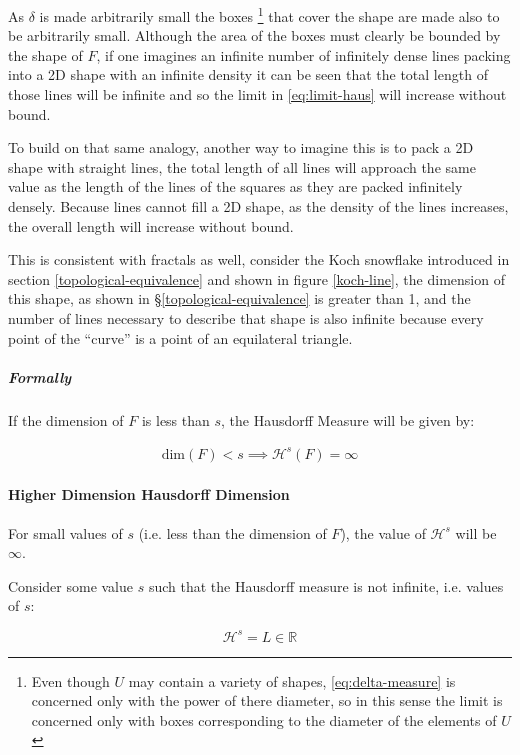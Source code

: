 \documentclass[a4paper,11pt,twoside]{article}
\begin{document}
As \(\delta\) is made arbitrarily small the boxes \footnote{Even though \(U\) may contain a variety of shapes, \eqref{eq:delta-measure} is concerned only with the power of there diameter, so in this sense the limit is concerned only with boxes corresponding to the diameter of the elements of \(U\)} that cover the shape are made also to be arbitrarily small. Although the area of the boxes must clearly be bounded by the shape of \(F\), if one imagines an infinite number of infinitely dense lines packing into a 2D shape with an infinite density it can be seen that the total length of those lines will be infinite and so the limit in \eqref{eq:limit-haus} will increase without bound.

To build on that same analogy, another way to imagine this is to pack a 2D shape with straight lines, the total length of all lines will approach the same value as the length of the lines of the squares as they are packed infinitely densely. Because lines cannot fill a 2D shape, as the density of the lines increases, the overall length will increase without bound.

This is consistent with fractals as well, consider the Koch snowflake introduced in section \ref{topological-equivalence} and shown in figure \ref{koch-line}, the dimension of this shape, as shown in \S \ref{topological-equivalence} is greater than 1, and the number of lines necessary to describe that shape is also infinite because every point of the ``curve'' is a point of an equilateral triangle.

\subparagraph{Formally}
\label{sec:org2193f0b}
If the dimension of \(F\) is less than \(s\), the Hausdorff Measure will be given by:

\begin{align}
\mathrm{dim}\left(  F \right ) < s \implies \mathcal{H}^{s} \left( F \right)  = \infty
\end{align}

\paragraph{Higher Dimension Hausdorff Dimension}
\label{sec:org98f6f33}


For small values of \(s\) (i.e. less than the dimension of  \(F\)), the value of \(\mathcal{H}^s\)  will be \(\infty\).

Consider some value \(s\) such that the Hausdorff measure is not infinite, i.e. values of \(s\):

\[
\mathcal{H}^s = L \in \mathbb{R}
\]
\end{document}

